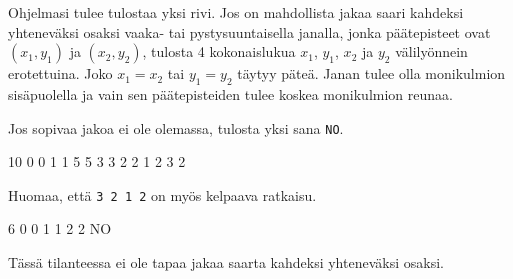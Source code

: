 \documentclass{boi2014-fi}
\newcommand{\constant}[1]{{\tt #1}}
\begin{document}
    \Output
    Ohjelmasi tulee tulostaa yksi rivi.
    Jos on mahdollista jakaa saari kahdeksi yhteneväksi osaksi
    vaaka- tai pystysuuntaisella janalla,
    jonka päätepisteet ovat $(x_1, y_1)$ ja $(x_2, y_2)$,
    tulosta 4 kokonaislukua $x_1$,
    $y_1$, $x_2$ ja $y_2$ välilyönnein erotettuina.
    Joko $x_1 = x_2$ tai $y_1 = y_2$ täytyy päteä.
    Janan tulee olla monikulmion sisäpuolella ja vain sen
    päätepisteiden tulee koskea monikulmion reunaa.
    
    Jos sopivaa jakoa ei ole olemassa, tulosta yksi sana \constant{NO}.

    \clearpage

    \Examples
    \example
    {
        10  0  0  1  1  5  5  3  3  2  2
    }
    {
        1 2 3 2
    }
    {
        Huomaa, että {\tt 3 2 1 2} on myös kelpaava ratkaisu.

        \begin{center}
        \end{center}
    }

    \example
    {
        6  0  0  1  1  2  2
    }
    {
        NO
    }
    {
        Tässä tilanteessa ei ole tapaa jakaa saarta kahdeksi yhteneväksi osaksi.
        \begin{center}
        \end{center}
    }
\end{document}
